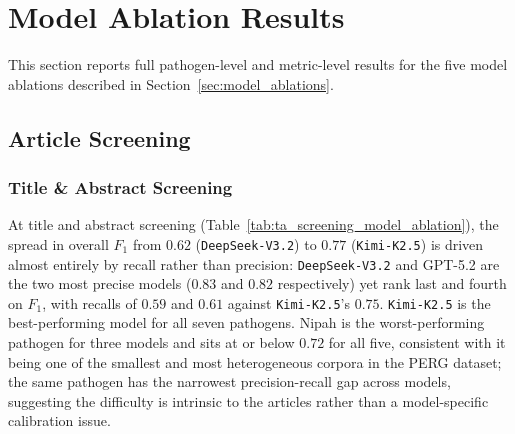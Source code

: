 \clearpage
\section{Model Ablation Results}\label{app:model_ablations}
This section reports full pathogen-level and metric-level results for the five model ablations described in Section~\ref{sec:model_ablations}. 


\subsection{Article Screening}
\subsubsection*{Title \& Abstract Screening}

At title and abstract screening (Table~\ref{tab:ta_screening_model_ablation}), the spread in overall $F_1$ from $0.62$ (\texttt{DeepSeek-V3.2}) to $0.77$ (\texttt{Kimi-K2.5}) is driven almost entirely by recall rather than precision: \texttt{DeepSeek-V3.2} and GPT-5.2 are the two most precise models ($0.83$ and $0.82$ respectively) yet rank last and fourth on $F_1$, with recalls of $0.59$ and $0.61$ against \texttt{Kimi-K2.5}'s $0.75$. \texttt{Kimi-K2.5} is the best-performing model for all seven pathogens. Nipah is the worst-performing pathogen for three models and sits at or below $0.72$ for all five, consistent with it being one of the smallest and most heterogeneous corpora in the PERG dataset; the same pathogen has the narrowest precision-recall gap across models, suggesting the difficulty is intrinsic to the articles rather than a model-specific calibration issue.


